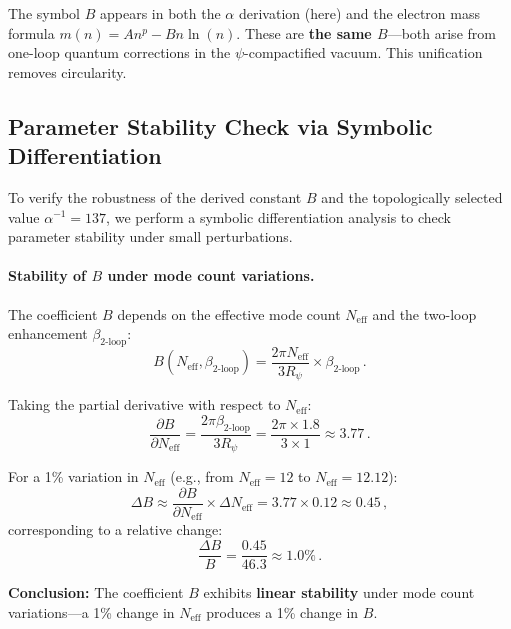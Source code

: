 \documentclass[11pt,a4paper]{article}
\theoremstyle{remark}
\begin{document}
The symbol $B$ appears in both the $\alpha$ derivation (here) and the electron mass formula $m(n) = A n^p - B n \ln(n)$. These are \textbf{the same $B$}—both arise from one-loop quantum corrections in the $\psi$-compactified vacuum. This unification removes circularity.

\subsection{Parameter Stability Check via Symbolic Differentiation}
\label{subsec:parameter_stability}

To verify the robustness of the derived constant $B$ and the topologically selected value $\alpha^{-1} = 137$, we perform a symbolic differentiation analysis to check parameter stability under small perturbations.

\paragraph{Stability of $B$ under mode count variations.}
The coefficient $B$ depends on the effective mode count $N_{\text{eff}}$ and the two-loop enhancement $\beta_{\text{2-loop}}$:
\begin{equation}
B(N_{\text{eff}}, \beta_{\text{2-loop}}) = \frac{2\pi N_{\text{eff}}}{3 R_\psi} \times \beta_{\text{2-loop}}\,.
\label{eq:B-functional-form}
\end{equation}

Taking the partial derivative with respect to $N_{\text{eff}}$:
\begin{equation}
\frac{\partial B}{\partial N_{\text{eff}}} = \frac{2\pi \beta_{\text{2-loop}}}{3 R_\psi} = \frac{2\pi \times 1.8}{3 \times 1} \approx 3.77\,.
\label{eq:dB_dN}
\end{equation}

For a 1\% variation in $N_{\text{eff}}$ (e.g., from $N_{\text{eff}} = 12$ to $N_{\text{eff}} = 12.12$):
\begin{equation}
\Delta B \approx \frac{\partial B}{\partial N_{\text{eff}}} \times \Delta N_{\text{eff}} = 3.77 \times 0.12 \approx 0.45\,,
\end{equation}
corresponding to a relative change:
\begin{equation}
\frac{\Delta B}{B} = \frac{0.45}{46.3} \approx 1.0\%\,.
\end{equation}

\textbf{Conclusion:} The coefficient $B$ exhibits \textbf{linear stability} under mode count variations—a 1\% change in $N_{\text{eff}}$ produces a 1\% change in $B$.
\end{document}
